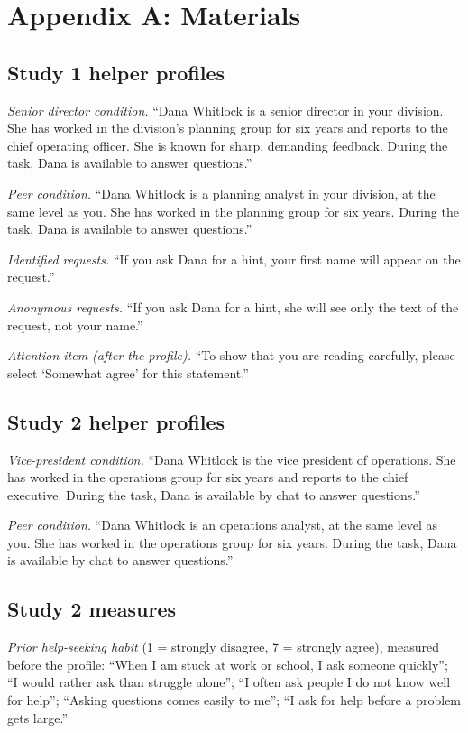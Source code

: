 \documentclass[11pt]{article}
\begin{document}
\clearpage
\appendix
\section*{Appendix A: Materials}

\subsection*{Study 1 helper profiles}

\textit{Senior director condition.} ``Dana Whitlock is a senior director in your division. She has worked in the division's planning group for six years and reports to the chief operating officer. She is known for sharp, demanding feedback. During the task, Dana is available to answer questions.''

\textit{Peer condition.} ``Dana Whitlock is a planning analyst in your division, at the same level as you. She has worked in the planning group for six years. During the task, Dana is available to answer questions.''

\textit{Identified requests.} ``If you ask Dana for a hint, your first name will appear on the request.''

\textit{Anonymous requests.} ``If you ask Dana for a hint, she will see only the text of the request, not your name.''

\textit{Attention item (after the profile).} ``To show that you are reading carefully, please select `Somewhat agree' for this statement.''

\subsection*{Study 2 helper profiles}

\textit{Vice-president condition.} ``Dana Whitlock is the vice president of operations. She has worked in the operations group for six years and reports to the chief executive. During the task, Dana is available by chat to answer questions.''

\textit{Peer condition.} ``Dana Whitlock is an operations analyst, at the same level as you. She has worked in the operations group for six years. During the task, Dana is available by chat to answer questions.''

\subsection*{Study 2 measures}

\textit{Prior help-seeking habit} (1 = strongly disagree, 7 = strongly agree), measured before the profile: ``When I am stuck at work or school, I ask someone quickly''; ``I would rather ask than struggle alone''; ``I often ask people I do not know well for help''; ``Asking questions comes easily to me''; ``I ask for help before a problem gets large.''
\end{document}
